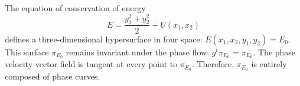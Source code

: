 The equation of conservation of energy
$$E = \frac{y_1^2 + y_2^2}{2} + U(x_1, x_2)$$
defines a three-dimensional hypersurface in four space: $E(x_1, x_2, y_1, y_2) = E_0$.
This surface $\pi_{E_0}$ remains invariant under the phase flow: $g^t \pi_{E_0} = \pi_{E_0}$.
The phase velocity vector field is tangent at every point to $\pi_{E_0}$. Therefore, $\pi_{E_0}$ is entirely composed of phase curves.
